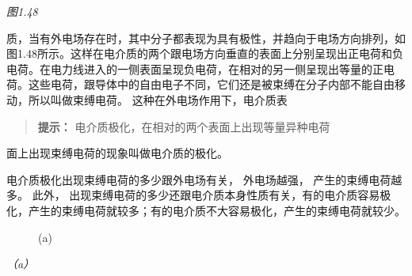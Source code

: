 \emph{图1.48}

质，当有外电场存在时，其中分子都表现为具有极性，并趋向于电场方向排列，如图1.48所示。这样在电介质的两个跟电场方向垂直的表面上分别呈现出正电荷和负电荷。在电力线进入的一侧表面呈现负电荷，在相对的另一侧呈现出等量的正电荷。这些电荷，跟导体中的自由电子不同，它们还是被束缚在分子内部不能自由移动，所以叫做束缚电荷。
这种在外电场作用下，电介质表

\begin{quote}
\textbf{提示：} 电介质极化，在相对的两个表面上出现等量异种电荷
\end{quote}

面上出现束缚电荷的现象叫做电介质的极化。

电介质极化出现束缚电荷的多少跟外电场有关， 外电场越强，
产生的束缚电荷越多。 此外，
出现束缚电荷的多少还跟电介质本身性质有关，有的电介质容易极化，产生的束缚电荷就较多；有的电介质不大容易极化，产生的束缚电荷就较少。

\begin{figure}
\centering
{}
\caption{(a)}
\end{figure}

\emph{（a）}

